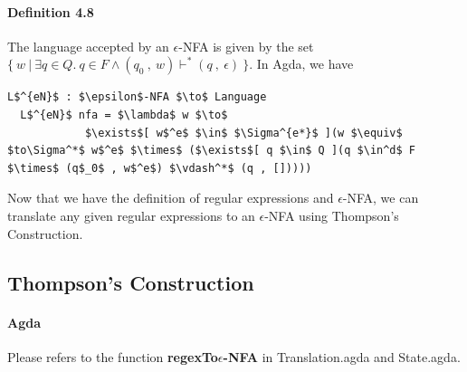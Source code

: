 \documentclass[twoside,openright,final]{bhamthesis}
\begin{document}
\paragraph{Definition 4.8} The language accepted by an
\(\epsilon\)-NFA is given by the set \(\{\ w\ |\ \exists q\in Q.\ q \in
F \wedge (q_0\ ,\ w) \vdash^* (q\ ,\ \epsilon)\ \}\). In Agda, we have
\begin{lstlisting}[mathescape=true,aboveskip=0pt]
  L$^{eN}$ : $\epsilon$-NFA $\to$ Language
  L$^{eN}$ nfa = $\lambda$ w $\to$ 
            $\exists$[ w$^e$ $\in$ $\Sigma^{e*}$ ](w $\equiv$ $to\Sigma^*$ w$^e$ $\times$ ($\exists$[ q $\in$ Q ](q $\in^d$ F $\times$ (q$_0$ , w$^e$) $\vdash^*$ (q , []))))
\end{lstlisting} 

\par Now that we have the definition of regular expressions and
\(\epsilon\)-NFA, we can translate any given regular expressions to an
\(\epsilon\)-NFA using Thompson's Construction.

\subsection{Thompson's Construction}
\paragraph{Agda} Please refers to the function
\textbf{regexTo\(\epsilon\)-NFA} in Translation.agda and State.agda. 
\end{document}
